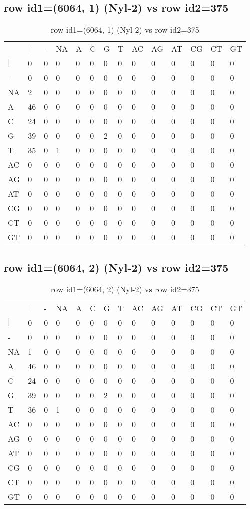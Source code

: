 \subsection{row id1=(6064, 1) (Nyl-2) vs row id2=375}
\begin{center}
\begin{longtable}{|l|l|l|l|l|l|l|l|l|l|l|l|l|l|}
\caption{row id1=(6064, 1) (Nyl-2) vs row id2=375} \label{table_dm38}\\
\hline
\\
\hline
&$|$&-&NA&A&C&G&T&AC&AG&AT&CG&CT&GT\\
$|$&0&0&0&0&0&0&0&0&0&0&0&0&0\\
-&0&0&0&0&0&0&0&0&0&0&0&0&0\\
NA&2&0&0&0&0&0&0&0&0&0&0&0&0\\
A&46&0&0&0&0&0&0&0&0&0&0&0&0\\
C&24&0&0&0&0&0&0&0&0&0&0&0&0\\
G&39&0&0&0&0&2&0&0&0&0&0&0&0\\
T&35&0&1&0&0&0&0&0&0&0&0&0&0\\
AC&0&0&0&0&0&0&0&0&0&0&0&0&0\\
AG&0&0&0&0&0&0&0&0&0&0&0&0&0\\
AT&0&0&0&0&0&0&0&0&0&0&0&0&0\\
CG&0&0&0&0&0&0&0&0&0&0&0&0&0\\
CT&0&0&0&0&0&0&0&0&0&0&0&0&0\\
GT&0&0&0&0&0&0&0&0&0&0&0&0&0\\
\hline
\end{longtable}
\end{center}

\subsection{row id1=(6064, 2) (Nyl-2) vs row id2=375}
\begin{center}
\begin{longtable}{|l|l|l|l|l|l|l|l|l|l|l|l|l|l|}
\caption{row id1=(6064, 2) (Nyl-2) vs row id2=375} \label{table_dm40}\\
\hline
\\
\hline
&$|$&-&NA&A&C&G&T&AC&AG&AT&CG&CT&GT\\
$|$&0&0&0&0&0&0&0&0&0&0&0&0&0\\
-&0&0&0&0&0&0&0&0&0&0&0&0&0\\
NA&1&0&0&0&0&0&0&0&0&0&0&0&0\\
A&46&0&0&0&0&0&0&0&0&0&0&0&0\\
C&24&0&0&0&0&0&0&0&0&0&0&0&0\\
G&39&0&0&0&0&2&0&0&0&0&0&0&0\\
T&36&0&1&0&0&0&0&0&0&0&0&0&0\\
AC&0&0&0&0&0&0&0&0&0&0&0&0&0\\
AG&0&0&0&0&0&0&0&0&0&0&0&0&0\\
AT&0&0&0&0&0&0&0&0&0&0&0&0&0\\
CG&0&0&0&0&0&0&0&0&0&0&0&0&0\\
CT&0&0&0&0&0&0&0&0&0&0&0&0&0\\
GT&0&0&0&0&0&0&0&0&0&0&0&0&0\\
\hline
\end{longtable}
\end{center}

